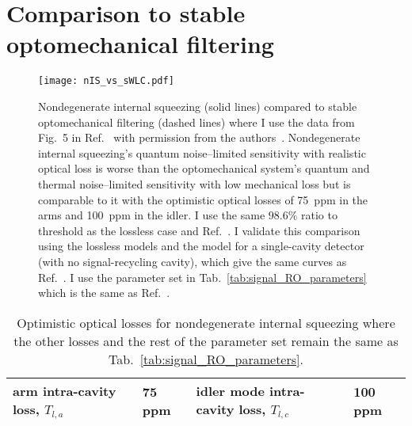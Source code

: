
\section{Comparison to stable optomechanical filtering} %
\label{sec:nIS_vs_sWLC}

\begin{figure}
	\centering
	\texttt{[image: nIS\_vs\_sWLC.pdf]}
	\caption{Nondegenerate internal squeezing (solid lines) compared to stable optomechanical filtering (dashed lines) where I use the data from Fig.~5 in Ref.~\cite{liBroadbandSensitivityImprovement2020} with permission from the authors~\cite{xiangLiPersonalCommunication}. Nondegenerate internal squeezing's quantum noise--limited sensitivity with realistic optical loss is worse than the optomechanical system's quantum and thermal noise--limited sensitivity with low mechanical loss but is comparable to it with the optimistic optical losses of 75~ppm in the arms and 100~ppm in the idler. I use the same $98.6\%$ ratio to threshold as the lossless case and Ref.~\cite{liBroadbandSensitivityImprovement2020}. I validate this comparison using the lossless models and the model for a single-cavity detector (with no signal-recycling cavity), which give the same curves as Ref.~\cite{liBroadbandSensitivityImprovement2020}. I use the parameter set in Tab.~\ref{tab:signal_RO_parameters} which is the same as Ref.~\cite{liBroadbandSensitivityImprovement2020}.}
	\label{fig:nIS_vs_sWLC}
\end{figure}

\begin{table}
\centering
\begin{tabular}{@{}ll|ll@{}}
\toprule
arm intra-cavity loss, $T_{l,a}$ & 75 ppm & idler mode intra-cavity loss, $T_{l,c}$ & 100 ppm \\ \bottomrule
\end{tabular}
\caption{Optimistic optical losses for nondegenerate internal squeezing where the other losses and the rest of the parameter set remain the same as Tab.~\ref{tab:signal_RO_parameters}.}
\label{tab:ideal_loss}
\end{table}

